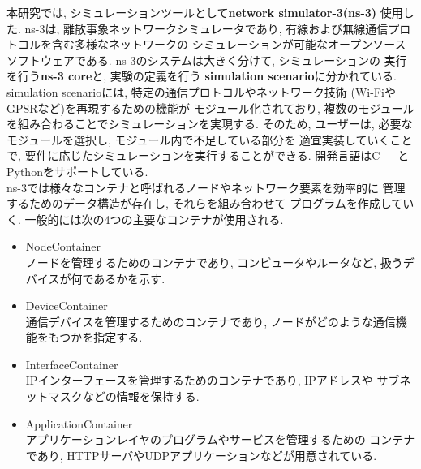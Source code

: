 本研究では, シミュレーションツールとして\textbf{network simulator-3(ns-3)}
\cite{ns-3}使用した. ns-3は, 離散事象ネットワークシミュレータであり, 
有線および無線通信プロトコルを含む多様なネットワークの
シミュレーションが可能なオープンソースソフトウェアである. 
ns-3のシステムは大きく分けて, シミュレーションの
実行を行う\textbf{ns-3 core}と, 実験の定義を行う
\textbf{simulation scenario}に分かれている. simulation scenarioには, 
特定の通信プロトコルやネットワーク技術 (Wi-FiやGPSRなど)を再現するための機能が
モジュール化されており, 複数のモジュールを組み合わることでシミュレーションを実現する. 
そのため, ユーザーは, 必要なモジュールを選択し, モジュール内で不足している部分を
適宜実装していくことで, 要件に応じたシミュレーションを実行することができる. 
開発言語はC++とPythonをサポートしている. \\
\indent ns-3では様々なコンテナと呼ばれるノードやネットワーク要素を効率的に
管理するためのデータ構造が存在し, それらを組み合わせて
プログラムを作成していく. 一般的には次の4つの主要なコンテナが使用される.
\begin{itemize}
  \item NodeContainer\\ 
  \indent ノードを管理するためのコンテナであり, 
  コンピュータやルータなど, 扱うデバイスが何であるかを示す. 
  \item DeviceContainer\\
  \indent 通信デバイスを管理するためのコンテナであり, 
  ノードがどのような通信機能をもつかを指定する. 
  \item InterfaceContainer\\
  \indent IPインターフェースを管理するためのコンテナであり, IPアドレスや
  サブネットマスクなどの情報を保持する.
  \item ApplicationContainer\\
  \indent アプリケーションレイヤのプログラムやサービスを管理するための
  コンテナであり, HTTPサーバやUDPアプリケーションなどが用意されている.
\end{itemize}
